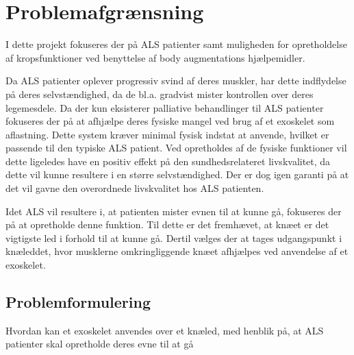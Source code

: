 \section{Problemafgrænsning}
I dette projekt fokuseres der på ALS patienter samt muligheden for opretholdelse af kropsfunktioner ved benyttelse af body augmentations hjælpemidler. 

Da ALS patienter oplever progressiv svind af deres muskler, har dette indflydelse på deres selvstændighed, da de bl.a. gradvist mister kontrollen over deres legemesdele. Da der kun eksisterer palliative behandlinger til ALS patienter fokuseres der på at afhjælpe deres fysiske mangel ved brug af et exoskelet som aflastning. Dette system kræver minimal fysisk indstat at anvende, hvilket er passende til den typiske ALS patient. 
Ved opretholdes af de fysiske funktioner vil dette ligeledes have en positiv effekt på den sundhedsrelateret livskvalitet, da dette vil kunne resultere i en større selvstændighed. Der er dog igen garanti på at det vil gavne den overordnede livskvalitet hos ALS patienten.  

Idet ALS vil resultere i, at patienten mister evnen til at kunne gå, fokuseres der på at opretholde denne funktion. Til dette er det fremhævet, at knæet er det vigtigste led i forhold til at kunne gå. Dertil vælges der at tages udgangspunkt i knæleddet, hvor musklerne omkringliggende knæet afhjælpes ved anvendelse af et exoskelet.

\subsection{Problemformulering}
Hvordan kan et exoskelet anvendes over et knæled, med henblik på, at ALS patienter skal opretholde deres evne til at gå 